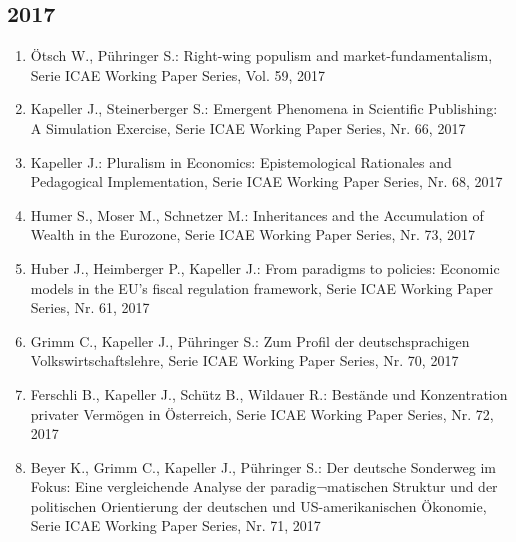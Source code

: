 \subsection*{2017}
\begin{enumerate}
    	 \item Ötsch W., Pühringer S.: Right-wing populism and market-fundamentalism, Serie ICAE Working Paper Series, Vol. 59, 2017
	 \item Kapeller J., Steinerberger S.: Emergent Phenomena in Scientific Publishing: A Simulation Exercise, Serie ICAE Working Paper Series, Nr. 66, 2017
	 \item Kapeller J.: Pluralism in Economics: Epistemological Rationales and Pedagogical Implementation, Serie ICAE Working Paper Series, Nr. 68, 2017
	 \item Humer S., Moser M., Schnetzer M.: Inheritances and the Accumulation of Wealth in the Eurozone, Serie ICAE Working Paper Series, Nr. 73, 2017
	 \item Huber J., Heimberger P., Kapeller J.: From paradigms to policies: Economic models in the EU’s fiscal regulation framework, Serie ICAE Working Paper Series, Nr. 61, 2017
	 \item Grimm C., Kapeller J., Pühringer S.: Zum Profil der deutschsprachigen Volkswirtschaftslehre, Serie ICAE Working Paper Series, Nr. 70, 2017
	 \item Ferschli B., Kapeller J., Schütz B., Wildauer R.: Bestände und Konzentration privater Vermögen in Österreich, Serie ICAE Working Paper Series, Nr. 72, 2017
	 \item Beyer K., Grimm C., Kapeller J., Pühringer S.: Der deutsche Sonderweg im Fokus: Eine vergleichende Analyse der paradig¬matischen Struktur und der politischen Orientierung der deutschen und US-amerikanischen Ökonomie, Serie ICAE Working Paper Series, Nr. 71, 2017
\end{enumerate}
